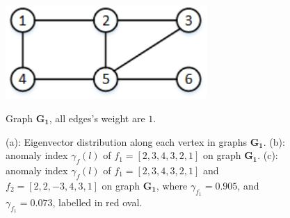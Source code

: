 \begin{figure}[h]
	\centering
    {
		\includegraphics[height=1.4in] {figures/graph_G.png}
	}
	\caption{Graph $\mathbf{G_1}$, all edges's weight are $1$.}
	\label{fig:graph_G}
\end{figure}


\begin{figure}[ht]
	\centering


	\caption{(a): Eigenvector distribution along each vertex in graphs $\mathbf{G_1}$.  (b): anomaly index $\gamma_f(l)$ of $f_1=[2,3,4,3,2,1]$ on graph $\mathbf{G_1}$. (c): anomaly index $\gamma_f(l)$ of $f_1=[2,3,4,3,2,1]$  and $f_2=[2,2,-3,4,3,1]$ on graph $\mathbf{G_1}$, where $\gamma_{f_1}=0.905$, and $\gamma_{f_1}=0.073$, labelled in red oval.}
	\label{fig:f_on_g2}
\end{figure}



